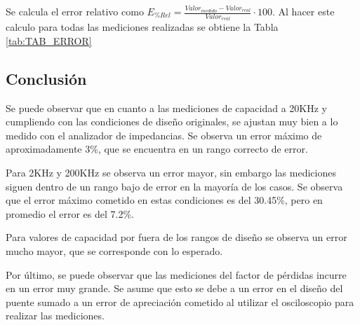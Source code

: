 Se calcula el error relativo como $E_{\%Rel} = \frac{Valor_{medido}-Valor_{real} }{Valor_{real}}\cdot 100$. Al hacer este calculo para todas las mediciones realizadas se obtiene la Tabla \ref{tab:TAB_ERROR}
\begin{table}[H]
    \centering
    \caption{Error relativo de C y D medidos}
    \label{tab:TAB_ERROR}
    \end{table}

\subsection{Conclusi\'on}
Se puede observar que en cuanto a las mediciones de capacidad a 20KHz y cumpliendo con las condiciones de dise\~no originales, se ajustan muy bien a lo medido con el analizador de impedancias. Se observa un error m\'aximo de aproximadamente 3\%, que se encuentra en un rango correcto de error. 

Para 2KHz y 200KHz se observa un error mayor, sin embargo las mediciones siguen dentro de un rango bajo de error en la mayor\'ia de los casos. Se observa que el error m\'aximo cometido en estas condiciones es del 30.45\%, pero en promedio el error es del 7.2\%.

Para valores de capacidad por fuera de los rangos de dise\~no se observa un error mucho mayor, que se corresponde con lo esperado.

Por \'ultimo, se puede observar que las mediciones del factor de p\'erdidas incurre en un error muy grande. Se asume que esto se debe a un error en el dise\~no del puente sumado a un error de apreciaci\'on cometido al utilizar el osciloscopio para realizar las mediciones. 
